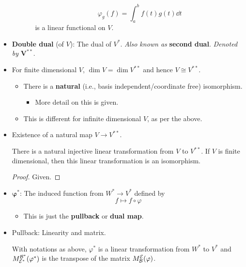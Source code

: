 \documentclass[../notes.tex]{subfiles}
\begin{document}
\begin{itemize}
\begin{enumerate}
\begin{itemize}
            \begin{equation*}
                \varphi_g(f) = \int_a^bf(t)g(t)\dd{t}
            \end{equation*}
            is a linear functional on $V$.
        \end{itemize}
    \end{enumerate}
    \item \textbf{Double dual} (of $V$): The dual of $V^*$. \emph{Also known as} \textbf{second dual}. \emph{Denoted by} $\bm{V^{**}}$.
    \item For finite dimensional $V$, $\dim V=\dim V^{**}$ and hence $V\cong V^{**}$.
    \begin{itemize}
        \item There is a \textbf{natural} (i.e., basis independent/coordinate free) isomorphism.
        \begin{itemize}
            \item More detail on this is given.
        \end{itemize}
        \item This is different for infinite dimensional $V$, as per the above.
    \end{itemize}
    \item Existence of a natural map $V\to V^{**}$.
    \begin{theorem}\label{trm:11.19}
        There is a natural injective linear transformation from $V$ to $V^{**}$. If $V$ is finite dimensional, then this linear transformation is an isomorphism.
        \begin{proof}
            Given.
        \end{proof}
    \end{theorem}
    \item $\bm{\varphi^*}$: The induced function from $W^*\to V^*$ defined by
    \begin{equation*}
        f \mapsto f\circ\varphi
    \end{equation*}
    \begin{itemize}
        \item This is just the \textbf{pullback} or \textbf{dual map}.
    \end{itemize}
    \item Pullback: Linearity and matrix.
    \begin{theorem}\label{trm:11.20}
        With notations as above, $\varphi^*$ is a linear transformation from $W^*$ to $V^*$ and $M_\mathcal{E^*}^\mathcal{B^*}(\varphi^*)$ is the transpose of the matrix $M_\mathcal{B}^\mathcal{E}(\varphi)$.

\end{theorem}
\end{itemize}
\end{document}
